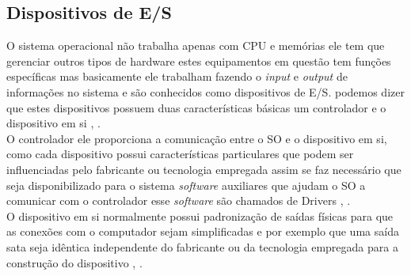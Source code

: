\subsection{Dispositivos de E/S}
O sistema operacional não trabalha apenas com CPU e memórias ele tem que gerenciar outros tipos de hardware estes equipamentos em questão tem funções específicas mas basicamente ele trabalham fazendo o \emph{input} e \emph{output} de informações no sistema e são conhecidos como dispositivos de E/S. podemos dizer que estes dispositivos possuem duas características básicas um controlador e o dispositivo em si \cite{Tanenbaum2016}, \cite{Comer2012}.\\
O controlador ele proporciona a comunicação entre o SO e o dispositivo em si, como cada dispositivo possui características particulares que podem ser influenciadas pelo fabricante ou tecnologia empregada assim se faz necessário que seja disponibilizado para o sistema \emph{software} auxiliares que ajudam o SO a comunicar com o controlador esse \emph{software} são chamados de Drivers \cite{Tanenbaum2016}, \cite{Comer2012}.\\
O dispositivo em si normalmente possui padronização de saídas físicas para que as conexões com o computador sejam simplificadas e por exemplo que uma saída sata seja idêntica independente do fabricante ou da tecnologia empregada para a construção do dispositivo \cite{Tanenbaum2016}, \cite{Comer2012}.